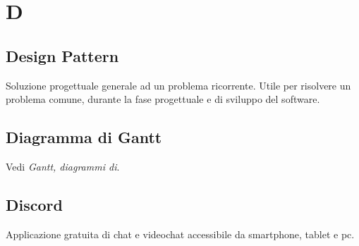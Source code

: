 \section{D}

\subsection{Design Pattern}
Soluzione progettuale generale ad un problema ricorrente. Utile per risolvere un problema comune, durante la fase progettuale e di sviluppo del software.

\subsection{Diagramma di Gantt}
Vedi \textit{Gantt, diagrammi di}\glo{}.

\subsection{Discord}
Applicazione gratuita di chat e videochat accessibile da smartphone, tablet e pc.


\clearpage